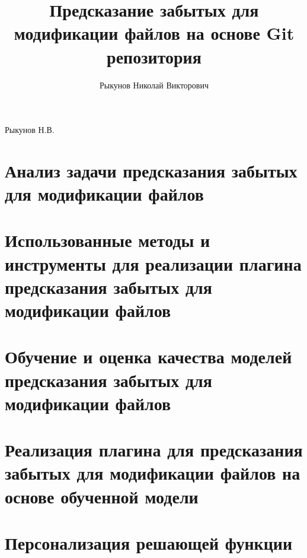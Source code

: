 \documentclass[times]{itmo-student-thesis}
\begin{document}
\title{Предсказание забытых для модификации файлов на основе Git репозитория}
\author{Рыкунов Николай Викторович}{Рыкунов Н.В.}




\tableofcontents

\startprefacepage



\chapter{Анализ задачи предсказания забытых для модификации файлов}


\chapter{Использованные методы и инструменты для реализации плагина предсказания забытых для модификации файлов}


\chapter{Обучение и оценка качества моделей предсказания забытых для модификации файлов}


\chapter{Реализация плагина для предсказания забытых для модификации файлов на основе обученной модели}


\startconclusionpage


\printmainbibliography

\appendix

\chapter{Персонализация решающей функции}

\end{document}
